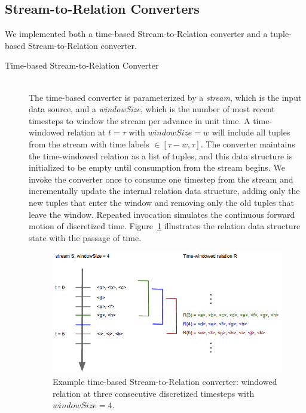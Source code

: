 \documentclass[a4paper, 10pt, conference]{IEEEconf}
\begin{document}
\subsection{Stream-to-Relation Converters}
We implemented both a time-based Stream-to-Relation converter and a tuple-based Stream-to-Relation converter. 



\begin{description}
    \item[Time-based Stream-to-Relation Converter] \hfill \\
    The time-based converter is parameterized by a \textit{stream}, which is the input data source, and a \textit{windowSize}, which is the number of most recent timesteps to window the stream per advance in unit time. A time-windowed relation at $t = \tau$ with $windowSize = w$ will include all tuples from the stream with time labels $\in [\tau - w, \tau]$. The converter maintains the time-windowed relation as a list of tuples, and this data structure is initialized to be empty until consumption from the stream begins. We invoke the converter once to consume one timestep from the stream and incrementally update the internal relation data structure, adding only the new tuples that enter the window and removing only the old tuples that leave the window. Repeated invocation simulates the continuous forward motion of discretized time. Figure~\ref{fig:time_window} illustrates the relation data structure state with the passage of time. 

    \begin{figure}[h!]
        \centering
        \centerline{\includegraphics[totalheight=4cm]{time_window.png}}
        \caption{Example time-based Stream-to-Relation converter: windowed relation at three consecutive discretized timesteps with $windowSize = 4$.}
        \label{fig:time_window}
    \end{figure}
  

\end{description}
\end{document}
